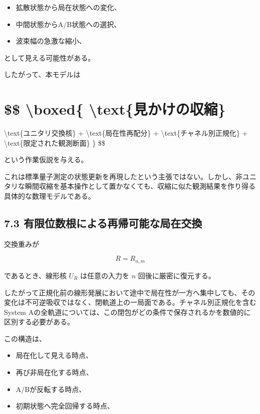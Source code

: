 \documentclass[
  a4paper,
  10pt]{article}
\providecommand{\tightlist}{%
  \setlength{\itemsep}{0pt}\setlength{\parskip}{0pt}}
\begin{document}
\begin{itemize}
\tightlist
\item
  拡散状態から局在状態への変化、
\item
  中間状態からA/B状態への選択、
\item
  波束幅の急激な縮小、
\end{itemize}

として見える可能性がある。

したがって、本モデルは

\section{\$\$ \textbackslash boxed\{
\textbackslash text\{見かけの収縮\}}\label{-boxed-textux898bux304bux3051ux306eux53ceux7e2e}

\textbackslash text\{ユニタリ交換核\} +
\textbackslash text\{局在性再配分\} +
\textbackslash text\{チャネル別正規化\} +
\textbackslash text\{限定された観測断面\} \} \$\$

という作業仮説を与える。

これは標準量子測定の状態更新を再現したという主張ではない。しかし、非ユニタリな瞬間収縮を基本操作として置かなくても、収縮に似た観測結果を作り得る具体的な数理モデルである。

\subsection{7.3
有限位数根による再帰可能な局在交換}\label{73-ux6709ux9650ux4f4dux6570ux6839ux306bux3088ux308bux518dux5e30ux53efux80fdux306aux5c40ux5728ux4ea4ux63db}

交換重みが

\[
R=R_{n,m}
\]

であるとき、線形核 \(U_R\) は任意の入力を \(n\) 回後に厳密に復元する。

したがって正規化前の線形発展において途中で局在性が一方へ集中しても、その変化は不可逆吸収ではなく、閉軌道上の一局面である。チャネル別正規化を含むSystem
Aの全軌道については、この閉包がどの条件で保存されるかを数値的に区別する必要がある。

この構造は、

\begin{itemize}
\tightlist
\item
  局在化して見える時点、
\item
  再び非局在化する時点、
\item
  A/Bが反転する時点、
\item
  初期状態へ完全回帰する時点、
\end{itemize}
\end{document}
